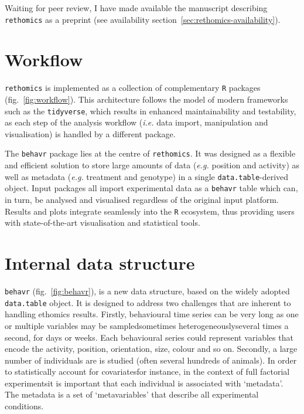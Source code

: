 Waiting for peer review, I have made available the manuscript describing \texttt{rethomics} as a preprint\cite{geissmann_rethomics_2018} (see availability section~\ref{sec:rethomics-availability}). 


\section{Workflow}

\texttt{rethomics} is implemented as a collection of complementary \texttt{R} packages (fig.~\ref{fig:workflow}).
This architecture follows the model of modern frameworks such as the \texttt{tidyverse}\cite{wickham_tidyverse_2017}, which results in enhanced maintainability and testability,
as each step of the analysis workflow (\emph{i.e.} data import, manipulation and visualisation) is handled by a different package.



The \texttt{behavr} package lies at the centre of \texttt{rethomics}.
It was designed as a flexible and efficient solution to store large amounts of data (\emph{e.g.} position and activity) as well as metadata (\emph{e.g.} treatment and genotype) in a single \texttt{data.table}-derived object\cite{dowle_data.table_2017}.
Input packages all import experimental data as a \texttt{behavr} table which can, in turn, be analysed and visualised regardless of the original input platform.
Results and plots integrate seamlessly into the \texttt{R} ecosystem, thus providing users with state-of-the-art visualisation and statistical tools.


\section{Internal data structure}
\texttt{behavr} (fig.~\ref{fig:behavr}), is a new data structure, based on the widely adopted \texttt{data.table} object\cite{dowle_data.table_2017}.
It is designed to address two challenges that are inherent to handling ethomics results.
Firstly, behavioural time series can be very long as one or multiple variables may be sampled\emd{}sometimes heterogeneously\emd{}several times a second, for days or weeks.
Each behavioural series could represent variables that encode the activity, position, orientation, size, colour and so on. 
Secondly, a large number of individuals are is studied (often several hundreds of animals).
In order to statistically account for covariates\emd{}for instance, in the context of full factorial experiments\emd{}it is important that each individual is associated with `metadata'.
The metadata is a set of `metavariables' that describe all experimental conditions.

